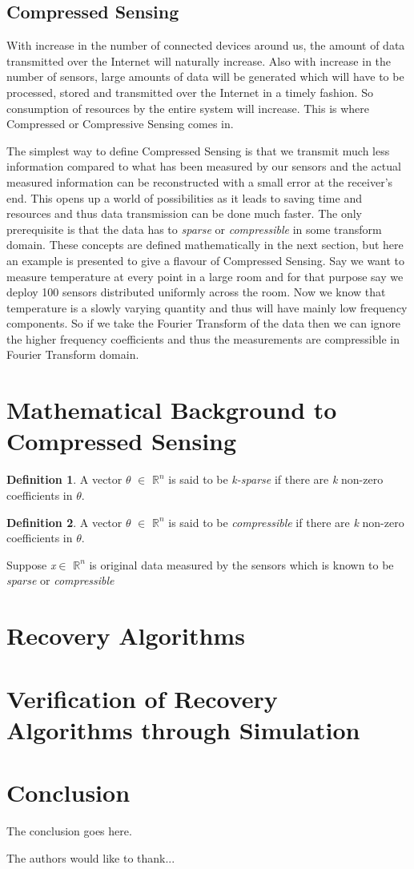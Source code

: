 \documentclass[12pt]{article}
\theoremstyle{definition}
\newtheorem{defn}{Definition}[section]
\begin{document}
  \subsection{Compressed Sensing}
  With increase in the number of connected devices around us, the amount of data transmitted over the Internet will naturally
  increase. Also with increase in the number of sensors, large amounts of data will be generated which will have to be 
  processed, stored and transmitted over the Internet in a timely fashion. So consumption of resources by the entire system
  will increase. This is where Compressed or Compressive Sensing comes in. 
  \par The simplest way to define Compressed Sensing is that we transmit much less information compared to what has been
  measured by our sensors and the actual measured information can be reconstructed with a small error at the receiver's end.
  This opens up a world of possibilities as it leads to saving time and resources and thus data transmission can be done
  much faster. The only prerequisite is that the data has to \textit{sparse} or \textit{compressible}
  in some transform domain. These concepts
  are defined mathematically in the next section, but here an example is presented to give a flavour of Compressed Sensing.
  Say we want to measure temperature at every point in a large room and for that purpose say we deploy 100 sensors distributed
  uniformly across the room. Now we know that temperature is a slowly varying quantity and thus will have mainly low
  frequency components. So if we take the Fourier Transform of the data then we can ignore the higher frequency coefficients
  and thus the measurements are compressible in Fourier Transform domain.
 
\section{Mathematical Background to Compressed Sensing}
\begin{defn}
 A vector $\theta$ $\in$ $\mathbb{R}^n$ is said to be \textit{k-sparse} if there are \textit{k} non-zero coefficients in $\theta$.
\end{defn}
\begin{defn}
 A vector $\theta$ $\in$ $\mathbb{R}^n$ is said to be \textit{compressible} if there are \textit{k} non-zero coefficients in $\theta$.
\end{defn}
Suppose \textit{x}$\in$ $\mathbb{R}^n$ is original data measured by the sensors which is known to be \textit{sparse} or 
\textit{compressible}
\section{Recovery Algorithms}
\section{Verification of Recovery Algorithms through Simulation}
\section{Conclusion}
The conclusion goes here.

The authors would like to thank...\cite{Whitmore-survey} \cite{Huang-DGS}





\end{document}
